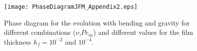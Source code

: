 \begin{figure}[h!]
  \begin{center}
    \graphicspath{ {/Users/thorey/Documents/These/Projet/Refroidissement/Skin_Model/Figure/JFM_V13/} }
    \texttt{[image: PhaseDiagramJFM\_Appendix2.eps]}
    \caption{Phase diagram for the  evolution with bending and gravity
      for different  combinations ($\nu$,$Pe_m$) and  different values
      for the film thickness $h_f = 10^{-2}$ and $10^{-4}$.}
    \label{C3-PhaseDiagramJFM_Appendix}
  \end{center}
\end{figure}




